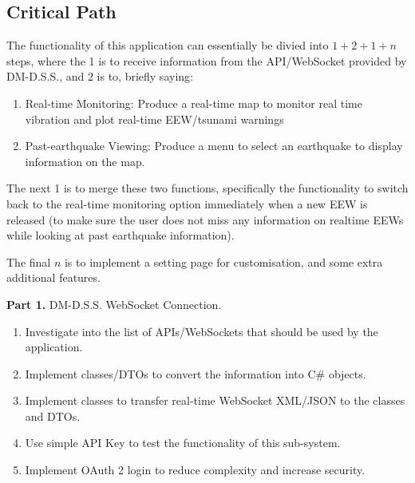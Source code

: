 \documentclass[10pt]{article}
\begin{document}
\subsection{Critical Path}

The functionality of this application can essentially be divied into \(1+2+1+n\) steps, where the 1 is to receive information from the API/WebSocket provided by DM-D.S.S., and 2 is to, briefly saying:
\begin{enumerate}
    \item Real-time Monitoring: Produce a real-time map to monitor real time vibration and plot real-time EEW/tsunami warnings
    \item Past-earthquake Viewing: Produce a menu to select an earthquake to display information on the map.
\end{enumerate}

The next 1 is to merge these two functions, specifically the functionality to switch back to the real-time monitoring option immediately when a new EEW is released (to make sure the user does not miss any information on realtime EEWs while looking at past earthquake information).

The final \(n\) is to implement a setting page for customisation, and some extra additional features.

\bigskip

\textbf{Part 1.} DM-D.S.S. WebSocket Connection.
\begin{enumerate}
    \item Investigate into the list of APIs/WebSockets that should be used by the application.
    \item Implement classes/DTOs to convert the information into C\# objects.
    \item Implement classes to transfer real-time WebSocket XML/JSON to the classes and DTOs.
    \item Use simple API Key to test the functionality of this sub-system.
    \item Implement OAuth 2 login to reduce complexity and increase security.
\end{enumerate}
\end{document}
